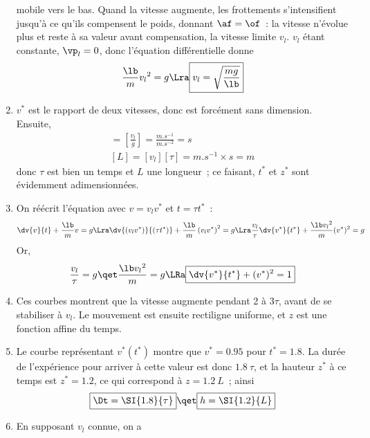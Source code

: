 \documentclass[a4paper, 12pt, final, garamond]{book}
\begin{document}
\begin{enumerate}
        mobile vers le bas. Quand la vitesse augmente, les frottements
        s'intensifient jusqu'à ce qu'ils compensent le poids, donnant $\af =
        \of$~: la vitesse n'évolue plus et reste à sa valeur avant compensation,
        la vitesse limite $v_l$. $v_l$ étant constante, $\vp_l = 0$, donc 
        l'équation différentielle donne
        \[ 
            \frac{\lb}{m}v_l{}^2 = g
            \Lra
            \boxed{v_l = \sqrt{\frac{mg}{\lb}}}
        \]
    \item $v^*$ est le rapport de deux vitesses, donc est forcément sans
        dimension. Ensuite,
        \begin{gather*}
            [\tau] = \left[\frac{v_l}{g}\right] =
                \frac{\si{m.s^{-1}}}{\si{m.s^{-2}}} = \si{s}
            \\
            [L] = [v_l][\tau] = \si{m.s^{-1}}\times\si{s} = \si{m}
        \end{gather*}
        donc $\tau$ est bien un temps et $L$ une longueur~; ce faisant, $t^*$ et
        $z^*$ sont évidemment adimensionnées.
    \item On réécrit l'équation avec $v = v_lv^*$ et $t=\tau t^*$~:
        \begin{gather*}
            \dv{v}{t} + \frac{\lb}{m}v = g
            \Lra
            \dv{(v_lv^*)}{(\tau t^*)} + \frac{\lb}{m} \left(v_lv^*\right)^2 = g
            \Lra
            \frac{v_l}{\tau} \dv{v^*}{t^*} + \frac{\lb v_l{}^2}{m}(v^*)^2 = g
        \end{gather*}
        Or,
        \begin{gather*}
            \frac{v_l}{\tau} = g
            \qet
            \frac{\lb v_l{}^2}{m} = g
            \LRa
            \boxed{\dv{v^*}{t^*} + (v^*)^2 = 1}
        \end{gather*}
    \item Ces courbes montrent que la vitesse augmente pendant 2 à 3$\tau$,
        avant de se stabiliser à $v_l$. Le mouvement est ensuite rectiligne
        uniforme, et $z$ est une fonction affine du temps.
    \item Le courbe représentant $v^*(t^*)$ montre que $v^* = \num{0.95}$ pour
        $t^* = \num{1.8}$. La durée de l'expérience pour arriver à cette valeur
        est donc $\SI{1.8}{\tau}$, et la hauteur $z^*$ à ce temps est $z^* =
        \num{1.2}$, ce qui correspond à $z = \SI{1.2}{L}$~; ainsi
        \[
            \boxed{\Dt = \SI{1.8}{\tau}}
            \qet
            \boxed{h = \SI{1.2}{L}}
        \]
    \item En supposant $v_l$ connue, on a

\end{enumerate}
\end{document}
